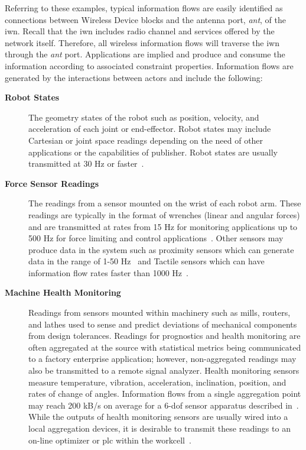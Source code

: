 Referring to these examples, typical information flows are easily identified as connections between Wireless Device blocks and the antenna port, \textit{ant}, of the \gls{iwn}.  Recall that the \gls{iwn} includes radio channel and services offered by the network itself.  Therefore, all wireless information flows will traverse the \gls{iwn} through the \textit{ant} port.  Applications are implied and produce and consume the information according to associated constraint properties.  Information flows are generated by the interactions between actors and include the following:  

\begin{description}
	
	\item[\textbf{Robot States}] The geometry states of the robot such as position, velocity, and acceleration of each joint or end-effector. Robot states may include Cartesian or joint space readings depending on the need of other applications or the capabilities of publisher.  Robot states are usually transmitted at 30 Hz or faster~\cite{JMarvel2017}.
	
	\item[\textbf{Force Sensor Readings}] The readings from a sensor mounted on the wrist of each robot arm. These readings are typically in the format of wrenches (linear and angular forces) and are transmitted at rates from 15 Hz for monitoring applications up to 500 Hz for force limiting and control applications~\cite{onrobot}. Other sensors may produce data in the system such as proximity sensors which can generate data in the range of 1-50 Hz~\cite{DiffuseSensorSpecs} and Tactile sensors which can have information flow rates faster than 1000 Hz~\cite{TactileInternet}.
	
	\item[\textbf{Machine Health Monitoring}] Readings from sensors mounted within machinery such as mills, routers, and lathes used to sense and predict deviations of mechanical components from design tolerances. Readings for prognostics and health monitoring are often aggregated at the source with statistical metrics being communicated to a factory enterprise application; however, non-aggregated readings may also be transmitted to a remote signal analyzer.  Health monitoring sensors measure temperature, vibration, acceleration, inclination, position, and rates of change of angles. Information flows from a single aggregation point may reach 200 kB/s on average for a 6-\gls{dof} sensor apparatus described in~\cite{ELWeiss}. While the outputs of health monitoring sensors are usually wired into a local aggregation devices, it is desirable to transmit these readings to an on-line optimizer or \gls{plc} within the workcell~\cite{Weiss2016.PHM}.
	

\end{description}
